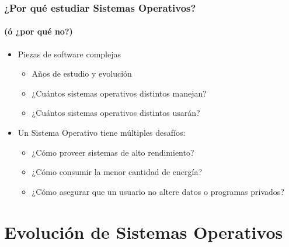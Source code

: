 \documentclass[letter]{beamer}
\begin{document}
\begin{frame}
  \frametitle{¿Por qué estudiar Sistemas Operativos?}
  \framesubtitle{(ó ¿por qué no?)}

  \begin{itemize}
    \item Piezas de software complejas
      \begin{itemize}
        \item Años de estudio y evolución
        \item ¿Cuántos sistemas operativos distintos manejan?
        \item ¿Cuántos sistemas operativos distintos usarán?
      \end{itemize}
    \item Un Sistema Operativo tiene múltiples desafíos:
      \begin{itemize}
        \item ¿Cómo proveer sistemas de alto rendimiento?
        \item ¿Cómo consumir la menor cantidad de energía?
        \item ¿Cómo asegurar que un usuario no altere datos o programas privados?
      \end{itemize}
  \end{itemize}

\end{frame}


\section{Evolución de Sistemas Operativos}
\end{document}
